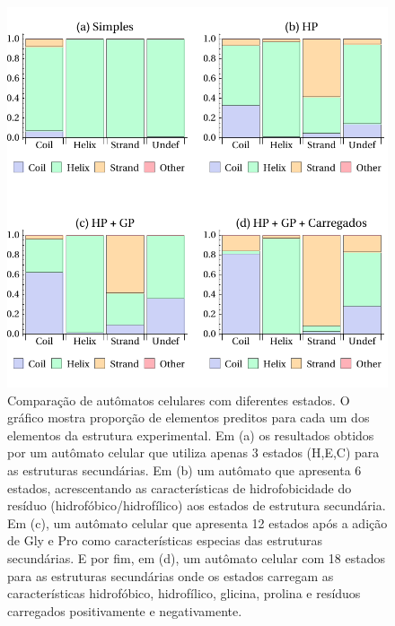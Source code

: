 \begin{figure}
  \centering
  \includegraphics[width=.9\textwidth]{figures/chamel_errors_ca.pdf}
  \caption{Comparação de autômatos celulares com diferentes estados. O gráfico mostra proporção de elementos preditos para cada um dos elementos da estrutura experimental. Em (a) os resultados obtidos por um autômato celular que utiliza apenas 3 estados (H,E,C) para as estruturas secundárias. Em (b) um autômato que apresenta 6 estados, acrescentando as características de hidrofobicidade do resíduo (hidrofóbico/hidrofílico) aos estados de estrutura secundária. Em (c), um autômato celular que apresenta 12 estados após a adição de Gly e Pro como características especias das estruturas secundárias. E por fim, em (d), um autômato celular com 18 estados para as estruturas secundárias onde os estados carregam as características hidrofóbico, hidrofílico, glicina, prolina e resíduos carregados positivamente e negativamente.} 
        \label{fig:ca_errors}
\end{figure}

